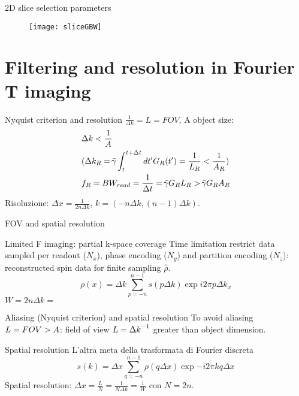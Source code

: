 \begin{wordonframe}{2D slice selection parameters}
\begin{figure}[!ht]\texttt{[image: sliceGBW]}\label{fig:sliceGBW}\end{figure}
\end{wordonframe}

\section{Filtering and resolution in Fourier T imaging}

\begin{frame}{Nyquist criterion and resolution}
$\frac{1}{\Delta k}=L=FOV$, A object size:
\begin{align*}
&\Delta k<\frac{1}{A}\\
&(\Delta k_R=\gammabar\int_t^{t+\Delta t}d t'G_R(t')=\frac{1}{L_R}<\frac{1}{A_R})\\
&f_R=BW_{read}=\frac{1}{\Delta t}=\gammabar G_RL_R>\gammabar G_RA_R
\end{align*}
Risoluzione: $\Delta x=\frac{1}{2n\Delta k}$, $k=(-n\Delta k,(n-1)\Delta k)$.
\end{frame}

\begin{frame}{FOV and spatial resolution}
    \begin{block}{Limited F imaging: partial k-space coverage}
    Time limitation restrict data sampled per readout ($N_x$), phase encoding ($N_y$) and partition encoding ($N_z$): reconstructed spin data for finite sampling $\hat{\rho}$.
    \begin{equation*}
        \rho(x)=\Delta k\sum_{p=-n}^{n-1}s(p\Delta k)\exp{i2\pi p\Delta k_x}
    \end{equation*}
    $W=2n\Delta k=$
    \end{block}
    \begin{block}{Aliasing (Nyquist criterion) and spatial resolution}
    To avoid aliasing $L=FOV{}>A$: field of view $L={\Delta k}^{-1}$ greater than object dimension.
    \end{block}
\begin{block}{Spatial resolution}
L'altra meta della trasformata di Fourier discreta
\begin{equation*}
s(k)=\Delta x\sum_{q=-n}^{n-1}\rho(q\Delta x)\exp{-i2\pi kq\Delta x}
\end{equation*}
Spatial resolution: $\Delta x=\frac{L}{N}=\frac{1}{N\Delta k}=\frac{1}{W}$ con $N=2n$.
\end{block}
\end{frame}

